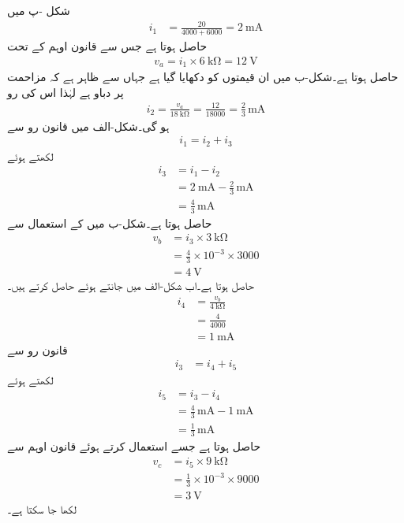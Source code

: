 شکل -پ میں
\begin{align*}
i_1&=\frac{20}{4000+6000}=\SI{2}{\milli\ampere}
\end{align*}
حاصل ہوتا ہے جس سے قانون اوہم کے تحت
\begin{align*}
v_a=i_1 \times \SI{6}{\kilo\ohm}=\SI{12}{\volt}
\end{align*}
حاصل ہوتا ہے۔شکل-ب میں ان قیمتوں کو دکھایا گیا ہے جہاں سے ظاہر ہے کہ  مزاحمت پر  دباو ہے لہٰذا اس کی رو
\begin{align*}
i_2=\frac{v_a}{\SI{18}{\kilo\ohm}}=\frac{12}{18000}=\frac{2}{3} \, \si{\milli\ampere}
\end{align*}
ہو گی۔شکل-الف میں قانون رو سے 
\begin{align*}
i_1=i_2+i_3
\end{align*}
لکھتے ہوئے
\begin{align*}
i_3&=i_1-i_2\\
&=\SI{2}{\milli\ampere}-\frac{2}{3}\, \si{\milli\ampere}\\
&=\frac{4}{3}\, \si{\milli\ampere}
\end{align*}
حاصل ہوتا ہے۔شکل-ب میں  کے استعمال سے
\begin{align*}
v_b&=i_3 \times \SI{3}{\kilo\ohm}\\
&=\frac{4}{3}\times 10^{-3} \times 3000\\
&=\SI{4}{\volt}
\end{align*}
حاصل ہوتا ہے۔اب شکل-الف میں  جانتے ہوئے  حاصل کرتے ہیں۔
\begin{align*}
i_4&=\frac{v_b}{\SI{4}{\kilo\ohm}}\\
&=\frac{4}{4000}\\
&=\SI{1}{\milli\ampere}
\end{align*}
قانون رو سے
\begin{align*}
i_3&=i_4+i_5
\end{align*}
لکھتے ہوئے
\begin{align*}
i_5&=i_3-i_4\\
&=\frac{4}{3}\, \si{\milli\ampere}-\SI{1}{\milli\ampere}\\
&=\frac{1}{3} \, \si{\milli\ampere}
\end{align*}
حاصل ہوتا ہے جسے استعمال کرتے ہوئے قانون اوہم سے
\begin{align*}
v_c&=i_5 \times \SI{9}{\kilo\ohm}\\
&=\frac{1}{3} \times 10^{-3} \times 9000\\
&=\SI{3}{\volt}
\end{align*}
لکھا جا سکتا ہے۔

